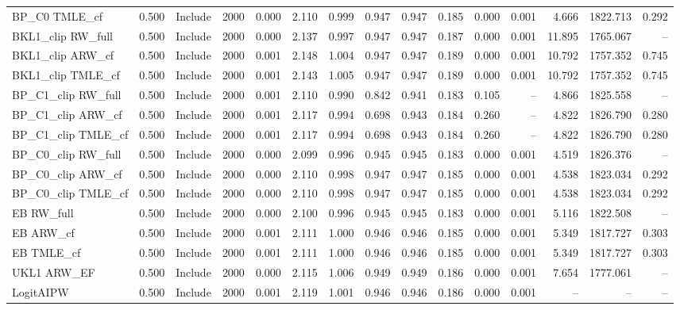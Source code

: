 \begin{tabular}{llllrrrrrrrrrrr}
BP\_C0 TMLE\_cf & 0.500 & Include & 2000 & 0.000 & 2.110 & 0.999 & 0.947 & 0.947 & 0.185 & 0.000 & 0.001 & 4.666 & 1822.713 & 0.292 \\
BKL1\_clip RW\_full & 0.500 & Include & 2000 & 0.000 & 2.137 & 0.997 & 0.947 & 0.947 & 0.187 & 0.000 & 0.001 & 11.895 & 1765.067 & -- \\
BKL1\_clip ARW\_cf & 0.500 & Include & 2000 & 0.001 & 2.148 & 1.004 & 0.947 & 0.947 & 0.189 & 0.000 & 0.001 & 10.792 & 1757.352 & 0.745 \\
BKL1\_clip TMLE\_cf & 0.500 & Include & 2000 & 0.001 & 2.143 & 1.005 & 0.947 & 0.947 & 0.189 & 0.000 & 0.001 & 10.792 & 1757.352 & 0.745 \\
BP\_C1\_clip RW\_full & 0.500 & Include & 2000 & 0.001 & 2.110 & 0.990 & 0.842 & 0.941 & 0.183 & 0.105 & -- & 4.866 & 1825.558 & -- \\
BP\_C1\_clip ARW\_cf & 0.500 & Include & 2000 & 0.001 & 2.117 & 0.994 & 0.698 & 0.943 & 0.184 & 0.260 & -- & 4.822 & 1826.790 & 0.280 \\
BP\_C1\_clip TMLE\_cf & 0.500 & Include & 2000 & 0.001 & 2.117 & 0.994 & 0.698 & 0.943 & 0.184 & 0.260 & -- & 4.822 & 1826.790 & 0.280 \\
BP\_C0\_clip RW\_full & 0.500 & Include & 2000 & 0.000 & 2.099 & 0.996 & 0.945 & 0.945 & 0.183 & 0.000 & 0.001 & 4.519 & 1826.376 & -- \\
BP\_C0\_clip ARW\_cf & 0.500 & Include & 2000 & 0.000 & 2.110 & 0.998 & 0.947 & 0.947 & 0.185 & 0.000 & 0.001 & 4.538 & 1823.034 & 0.292 \\
BP\_C0\_clip TMLE\_cf & 0.500 & Include & 2000 & 0.000 & 2.110 & 0.998 & 0.947 & 0.947 & 0.185 & 0.000 & 0.001 & 4.538 & 1823.034 & 0.292 \\
EB RW\_full & 0.500 & Include & 2000 & 0.000 & 2.100 & 0.996 & 0.945 & 0.945 & 0.183 & 0.000 & 0.001 & 5.116 & 1822.508 & -- \\
EB ARW\_cf & 0.500 & Include & 2000 & 0.001 & 2.111 & 1.000 & 0.946 & 0.946 & 0.185 & 0.000 & 0.001 & 5.349 & 1817.727 & 0.303 \\
EB TMLE\_cf & 0.500 & Include & 2000 & 0.001 & 2.111 & 1.000 & 0.946 & 0.946 & 0.185 & 0.000 & 0.001 & 5.349 & 1817.727 & 0.303 \\
UKL1 ARW\_EF & 0.500 & Include & 2000 & 0.000 & 2.115 & 1.006 & 0.949 & 0.949 & 0.186 & 0.000 & 0.001 & 7.654 & 1777.061 & -- \\
LogitAIPW & 0.500 & Include & 2000 & 0.001 & 2.119 & 1.001 & 0.946 & 0.946 & 0.186 & 0.000 & 0.001 & -- & -- & -- \\

\end{tabular}
